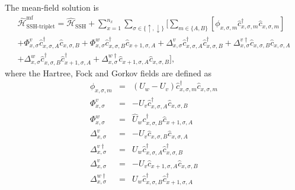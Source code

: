 The mean-field solution is
\begin{multline}
    \hat{\mathcal H}_\text{SSH-triplet}^\text{mf} =  
    \hat{\mathcal H}_\text{SSH} +
    \sum_{x=1}^{n_x} \sum_{\sigma\in\{\uparrow,\downarrow\}}
    \Bigg[
    \sum_{m\in\{A,B\}}\left[
    \phi_{x,\sigma, m} \hat c_{x, \sigma, m}^\dagger \hat c_{x, \sigma, m} \right]\\
    +\Phi_{x,\sigma}^v \hat c_{x, \sigma, A}^\dagger \hat c_{x, \sigma, B}
    +\Phi_{x,\sigma}^w \hat c_{x, \sigma, B}^\dagger \hat c_{x+1, \sigma, A}
    +\Delta_{x,\sigma}^v \hat c_{x, \sigma, A}^\dagger \hat c_{x, \sigma, B}^\dagger 
    +\Delta_{x,\sigma}^{v\dagger} \hat c_{x, \sigma, B} \hat c_{x, \sigma, A}\\
    +\Delta_{x,\sigma}^w \hat c_{x, \sigma, B}^\dagger \hat c_{x+1, \sigma, A}^\dagger 
    +\Delta_{x,\sigma}^{w\dagger}
    \hat c_{x+1, \sigma, A} \hat c_{x, \sigma, B}
\Bigg],
\label{eq:one-dimensional_SSH}
\end{multline}
where the Hartree, Fock and Gorkov fields are defined as
\begin{eqnarray}
\phi_{x,\sigma, m}&=& (U_w-U_v)\hat c_{x, \sigma, m}^\dagger \hat c_{x, \sigma, m}\\
\Phi_{x,\sigma}^v&=& -U_v \hat c_{x, \sigma, A}^\dagger \hat c_{x, \sigma, B}\\
\Phi_{x,\sigma}^w&=&\hat U_w c_{x, \sigma, B}^\dagger \hat c_{x+1, \sigma, A}\\
\Delta_{x,\sigma}^{v}&=& -U_v \hat c_{x, \sigma, B} \hat c_{x, \sigma, A}\\
\Delta_{x,\sigma}^{v\dagger}&=& U_w \hat c_{x, \sigma, A}^\dagger \hat c_{x, \sigma, B}^\dagger \\
\Delta_{x,\sigma}^{v}&=& -U_v \hat c_{x+1, \sigma, A} \hat c_{x, \sigma, B} \\
\Delta_{x,\sigma}^{w\dagger}&=& U_w \hat c_{x, \sigma, B}^\dagger \hat c_{x+1, \sigma, A}^\dagger 
\end{eqnarray}




